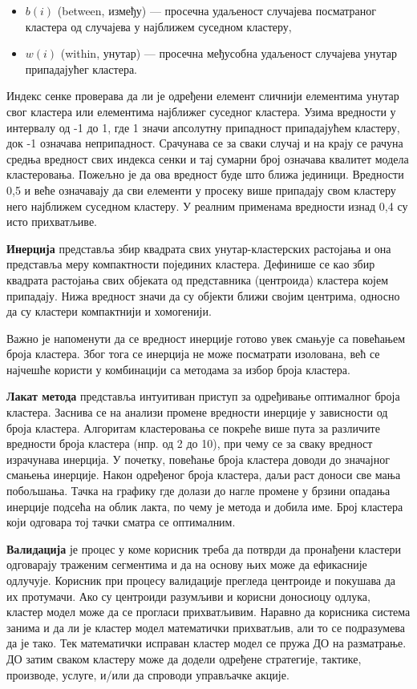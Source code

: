 \begin{itemize}
  \item $b(i)$ (between, између) — просечна удаљеност случајева посматраног кластера од случајева у најближем суседном кластеру,
  \item $w(i)$ (within, унутар) — просечна међусобна удаљеност случајева унутар припадајућег кластера.
\end{itemize}
Индекс сенке проверава да ли је одређени елемент сличнији елементима унутар свог кластера или елементима најближег суседног кластера. Узима вредности у интервалу од -1 до 1, где 1 значи апсолутну припадност припадајућем кластеру, док -1 означава неприпадност. Срачунава се за сваки случај и на крају се рачуна средња вредност свих индекса сенки и тај сумарни број означава квалитет модела кластеровања. Пожељно је да ова вредност буде што ближа јединици. Вредности 0,5 и веће означавају да сви елементи у просеку више припадају свом кластеру него најближем суседном кластеру. У реалним применама вредности изнад 0,4 су исто прихватљиве.

\textbf{Инерција} представља збир квадрата свих унутар-кластерских растојања и она представља меру компактности појединих кластера. Дефинише се као збир квадрата растојања свих објеката од представника (центроида) кластера којем припадају. Нижа вредност значи да су објекти ближи својим центрима, односно да су кластери компактнији и хомогенији.

Важно је напоменути да се вредност инерције готово увек смањује са повећањем броја кластера. Због тога се инерција не може посматрати изолована, већ се најчешће користи у комбинацији са методама за избор броја кластера.

\textbf{Лакат метода} представља интуитиван приступ за одређивање оптималног броја кластера. Заснива се на анализи промене вредности инерције у зависности од броја кластера. Алгоритам кластеровања се покреће више пута за различите вредности броја кластера (нпр. од 2 до 10), при чему се за сваку вредност израчунава инерција. У почетку, повећање броја кластера доводи до значајног смањења инерције. Након одређеног броја кластера, даљи раст доноси све мања побољшања. Тачка на графику где долази до нагле промене у брзини опадања инерције подсећа на облик лакта, по чему је метода и добила име. Број кластера који одговара тој тачки сматра се оптималним.

\textbf{Валидација} је процес у коме корисник треба да потврди да пронађени кластери одговарају траженим сегментима и да на основу њих може да ефикасније одлучује. Корисник при процесу валидације прегледа центроиде и покушава да их протумачи. Ако су центроиди разумљиви и корисни доносиоцу одлука, кластер модел може да се прогласи прихватљивим. Наравно да корисника система занима и да ли је кластер модел математички прихватљив, али то се подразумева да је тако. Тек математички исправан кластер модел се пружа ДО на разматрање. ДО затим сваком кластеру може да додели одређене стратегије, тактике, производе, услуге, и/или да спроводи управљачке акције.

